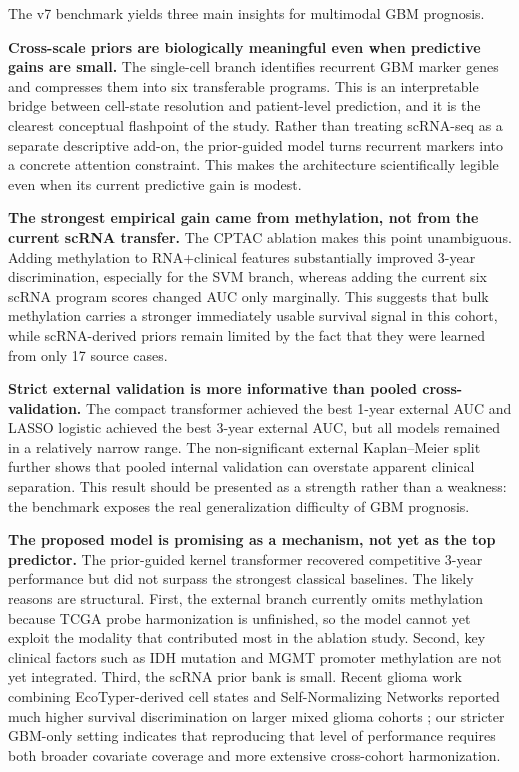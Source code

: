 The v7 benchmark yields three main insights for multimodal GBM prognosis.

\textbf{Cross-scale priors are biologically meaningful even when predictive gains are small.} The single-cell branch identifies recurrent GBM marker genes and compresses them into six transferable programs. This is an interpretable bridge between cell-state resolution and patient-level prediction, and it is the clearest conceptual flashpoint of the study. Rather than treating scRNA-seq as a separate descriptive add-on, the prior-guided model turns recurrent markers into a concrete attention constraint. This makes the architecture scientifically legible even when its current predictive gain is modest.

\textbf{The strongest empirical gain came from methylation, not from the current scRNA transfer.} The CPTAC ablation makes this point unambiguous. Adding methylation to RNA+clinical features substantially improved 3-year discrimination, especially for the SVM branch, whereas adding the current six scRNA program scores changed AUC only marginally. This suggests that bulk methylation carries a stronger immediately usable survival signal in this cohort, while scRNA-derived priors remain limited by the fact that they were learned from only 17 source cases.

\textbf{Strict external validation is more informative than pooled cross-validation.} The compact transformer achieved the best 1-year external AUC and LASSO logistic achieved the best 3-year external AUC, but all models remained in a relatively narrow range. The non-significant external Kaplan--Meier split further shows that pooled internal validation can overstate apparent clinical separation. This result should be presented as a strength rather than a weakness: the benchmark exposes the real generalization difficulty of GBM prognosis.

\textbf{The proposed model is promising as a mechanism, not yet as the top predictor.} The prior-guided kernel transformer recovered competitive 3-year performance but did not surpass the strongest classical baselines. The likely reasons are structural. First, the external branch currently omits methylation because TCGA probe harmonization is unfinished, so the model cannot yet exploit the modality that contributed most in the ablation study. Second, key clinical factors such as IDH mutation and MGMT promoter methylation are not yet integrated. Third, the scRNA prior bank is small. Recent glioma work combining EcoTyper-derived cell states and Self-Normalizing Networks reported much higher survival discrimination on larger mixed glioma cohorts \cite{fan2025tme}; our stricter GBM-only setting indicates that reproducing that level of performance requires both broader covariate coverage and more extensive cross-cohort harmonization.

